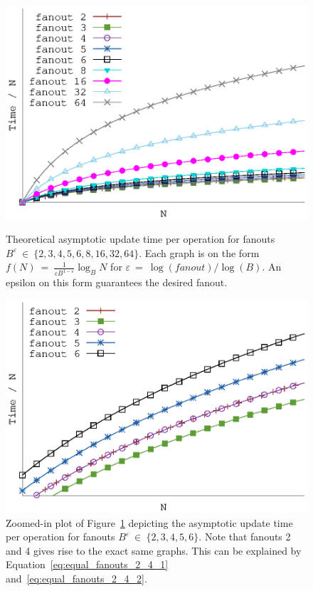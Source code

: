 \documentclass[twoside,11pt,openright]{report}
\def \epsilon {\varepsilon}
\begin{document}
\begin{figure}[h]
\centering
\begin{minipage}[t]{0.48\columnwidth}
  \centering
  \includegraphics[width=\linewidth]{../plots/gerth_update_epsilon/gerth_epsilon}
  \caption{Theoretical asymptotic update time per operation for fanouts $B^\epsilon~\in~\{2, 3, 4, 5, 6, 8, 16, 32, 64\}$. Each graph is on the form $f(N)~=~\frac{1}{\epsilon B^{1-\epsilon}} \log_B N$ for $\epsilon~=~\log(fanout) / \log(B)$. An epsilon on this form guarantees the desired fanout.}
  \label{fig:gerth_fanout_experiment}
\end{minipage}
\hfill
\begin{minipage}[t]{0.48\columnwidth}
  \centering
  \includegraphics[width=\linewidth]{../plots/gerth_update_epsilon/gerth_epsilon_zoom}
  \caption{Zoomed-in plot of Figure~\ref{fig:gerth_fanout_experiment} depicting the asymptotic update time per operation for fanouts $B^\epsilon~\in~\{2, 3, 4, 5, 6\}$. Note that fanouts 2 and 4 gives rise to the exact same graphs. This can be explained by Equation~\ref{eq:equal_fanouts_2_4_1} and~\ref{eq:equal_fanouts_2_4_2}.}

\end{minipage}
\end{figure}
\end{document}
